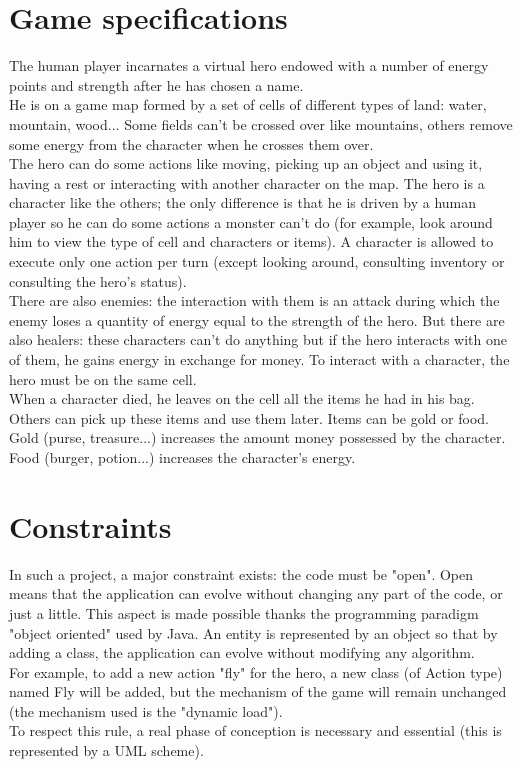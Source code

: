 \documentclass[a4paper,6pt]{article}
\begin{document}

\section{Game specifications}

The human player incarnates a virtual hero endowed with a number of energy points and strength after he has chosen a name.\\
He is on a game map formed by a set of cells of different types of land: water, mountain, wood... Some fields can't be crossed over like mountains, others remove some energy from the character when he crosses them over.\\
The hero can do some actions like moving, picking up an object and using it, having a rest or interacting with another character on the map. The hero is a character like the others; the only difference is that he is driven by a human player so he can do some actions a monster can't do (for example, look around him to view the type of cell and characters or items). A character is allowed to execute only one action per turn (except looking around, consulting inventory or consulting the hero's status).\\
There are also enemies: the interaction with them is an attack during which the enemy loses a quantity of energy equal to the strength of the hero. But there are also healers: these characters can't do anything but if the hero interacts with one of them, he gains energy in exchange for money. To interact with a character, the hero must be on the same cell.\\
When a character died, he leaves on the cell all the items he had in his bag. Others can pick up these items and use them later. Items can be gold or food. Gold (purse, treasure...) increases the amount money possessed by the character. Food (burger, potion...) increases the character's energy.\\


\section{Constraints}

In such a project, a major constraint exists: the code must be "open". Open means that the application can evolve without changing any part of the code, or just a little. This aspect is made possible thanks the programming paradigm "object oriented" used by Java. An entity is represented by an object so that by adding a class, the application can evolve without modifying any algorithm.\\
For example, to add a new action "fly" for the hero, a new class (of Action type) named Fly will be added, but the mechanism of the game will remain unchanged (the mechanism used is the "dynamic load").\\
To respect this rule, a real phase of conception is necessary and essential (this is represented by a UML scheme).\\
\end{document}
